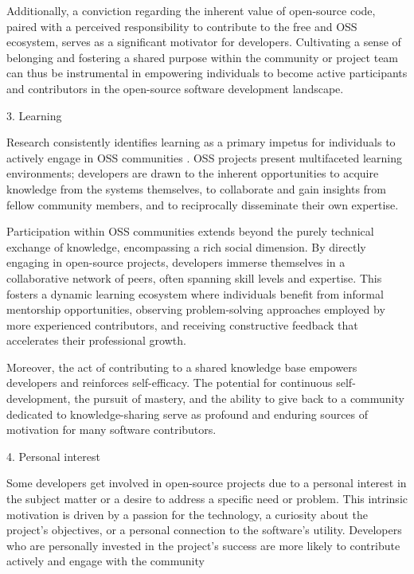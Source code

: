 Additionally,  a conviction regarding the inherent value of open-source code, paired with a perceived responsibility to contribute to the free and OSS ecosystem, serves as a significant motivator for developers. Cultivating a sense of belonging and fostering a shared purpose within the community or project team can thus be instrumental in empowering individuals to become active participants and contributors in the open-source software development landscape.



3. Learning

Research consistently identifies learning as a primary impetus for individuals to actively engage in OSS communities \parencite{06ye2003toward, 07zhao2024openrank, 08zhang2024paid, 09lakhani2005hackers, 10wu2007empirical, 11gerosa2021shifting, 12choi2015characteristics, 17alexander2002working, 18oreg2008exploring}. OSS projects present multifaceted learning environments; developers are drawn to the inherent opportunities to acquire knowledge from the systems themselves, to collaborate and gain insights from fellow community members, and to reciprocally disseminate their own expertise.

Participation within OSS communities extends beyond the purely technical exchange of knowledge, encompassing a rich social dimension. By directly engaging in open-source projects, developers immerse themselves in a collaborative network of peers, often spanning skill levels and expertise. This fosters a dynamic learning ecosystem where individuals benefit from informal mentorship opportunities, observing problem-solving approaches employed by more experienced contributors, and receiving constructive feedback that accelerates their professional growth.

Moreover, the act of contributing to a shared knowledge base empowers developers and reinforces self-efficacy. The potential for continuous self-development, the pursuit of mastery, and the ability to give back to a community dedicated to knowledge-sharing serve as profound and enduring sources of motivation for many software contributors.

4. Personal interest

Some developers get involved in open-source projects due to a personal interest in the subject matter or a desire to address a specific need or problem. This intrinsic motivation is driven by a passion for the technology, a curiosity about the project's objectives, or a personal connection to the software's utility. Developers who are personally invested in the project's success are more likely to contribute actively and engage with the community \cite{06ye2003toward,07zhao2024openrank,09lakhani2005hackers,11gerosa2021shifting,12choi2015characteristics,13li2012leadership,16ke2008motivations,17alexander2002working}

